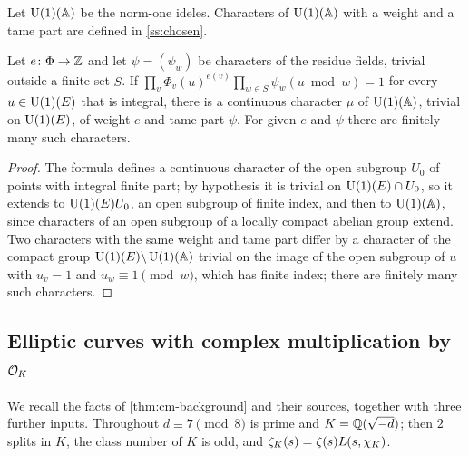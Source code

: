 Let $\operatorname{U}(1)(\mathbb{A})$ be the norm-one ideles. Characters of $\operatorname{U}(1)(\mathbb{A})$ with a weight and a tame part are
defined in \cref{ss:chosen}.

\begin{theorem}\label{thm:B-characters-of-weight}
Let $e\colon\Phi\to\mathbb{Z}$ and let $\psi=(\psi_w)$ be characters of the residue fields, trivial outside a
finite set $S$. If $\prod_v\Phi_v(u)^{e(v)}\prod_{w\in S}\psi_w(u\bmod w)=1$ for every
$u\in\operatorname{U}(1)(E)$ that is integral, there is a continuous character $\mu$ of $\operatorname{U}(1)(\mathbb{A})$, trivial on
$\operatorname{U}(1)(E)$, of weight $e$ and tame part $\psi$. For given $e$ and $\psi$ there are finitely many such
characters.
\end{theorem}

\begin{proof}
The formula defines a continuous character of the open subgroup $U_0$ of points with integral finite
part; by hypothesis it is trivial on $\operatorname{U}(1)(E)\cap U_0$, so it extends to $\operatorname{U}(1)(E)U_0$, an open subgroup
of finite index, and then to $\operatorname{U}(1)(\mathbb{A})$, since characters of an open subgroup of a locally compact
abelian group extend. Two characters with the same weight and tame part differ by a character of the
compact group $\operatorname{U}(1)(E)\backslash\operatorname{U}(1)(\mathbb{A})$ trivial on the image of the open subgroup of $u$ with
$u_v=1$ and $u_w\equiv1\pmod w$, which has finite index; there are finitely many such characters.
\end{proof}

\subsection{Elliptic curves with complex multiplication by \texorpdfstring{$\mathcal{O}_K$}{OK}}\label{ss:B-cm}
We recall the facts of \cref{thm:cm-background} and their sources, together with three further
inputs. Throughout $d\equiv7\pmod8$ is prime and $K=\mathbb{Q}(\sqrt{-d})$; then $2$ splits in $K$, the class
number of $K$ is odd, and $\zeta_K(s)=\zeta(s)L(s,\chi_K)$.

